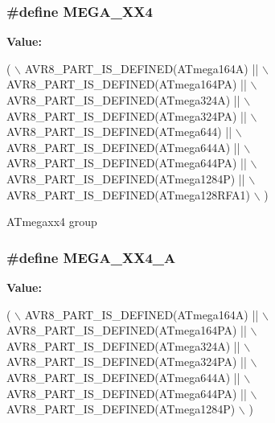 \hypertarget{group__mega__part__macros__group_gadcf5297df4d3d2f2bb5ccd7d6e3578b6}{
\subsubsection[{M\-E\-G\-A\-\_\-\-X\-X4}]{\setlength{\rightskip}{0pt plus 5cm}\#define M\-E\-G\-A\-\_\-\-X\-X4}}\label{group__mega__part__macros__group_gadcf5297df4d3d2f2bb5ccd7d6e3578b6}
{\bfseries Value\-:}
\begin{DoxyCode}
( \(\backslash\)
        AVR8\_PART\_IS\_DEFINED(ATmega164A)  || \(\backslash\)
        AVR8\_PART\_IS\_DEFINED(ATmega164PA) || \(\backslash\)
        AVR8\_PART\_IS\_DEFINED(ATmega324A)  || \(\backslash\)
        AVR8\_PART\_IS\_DEFINED(ATmega324PA) || \(\backslash\)
        AVR8\_PART\_IS\_DEFINED(ATmega644)   || \(\backslash\)
        AVR8\_PART\_IS\_DEFINED(ATmega644A)  || \(\backslash\)
        AVR8\_PART\_IS\_DEFINED(ATmega644PA) || \(\backslash\)
        AVR8\_PART\_IS\_DEFINED(ATmega1284P)   || \(\backslash\)
        AVR8\_PART\_IS\_DEFINED(ATmega128RFA1) \(\backslash\)
        )
\end{DoxyCode}
A\-Tmegaxx4 group \hypertarget{group__mega__part__macros__group_gaf7dde20cbd5a8e5d53438e8dfac074a2}{
\subsubsection[{M\-E\-G\-A\-\_\-\-X\-X4\-\_\-\-A}]{\setlength{\rightskip}{0pt plus 5cm}\#define M\-E\-G\-A\-\_\-\-X\-X4\-\_\-\-A}}\label{group__mega__part__macros__group_gaf7dde20cbd5a8e5d53438e8dfac074a2}
{\bfseries Value\-:}
\begin{DoxyCode}
( \(\backslash\)
        AVR8\_PART\_IS\_DEFINED(ATmega164A)  || \(\backslash\)
        AVR8\_PART\_IS\_DEFINED(ATmega164PA) || \(\backslash\)
        AVR8\_PART\_IS\_DEFINED(ATmega324A)  || \(\backslash\)
        AVR8\_PART\_IS\_DEFINED(ATmega324PA) || \(\backslash\)
        AVR8\_PART\_IS\_DEFINED(ATmega644A)  || \(\backslash\)
        AVR8\_PART\_IS\_DEFINED(ATmega644PA) || \(\backslash\)
        AVR8\_PART\_IS\_DEFINED(ATmega1284P) \(\backslash\)
        )
\end{DoxyCode}
